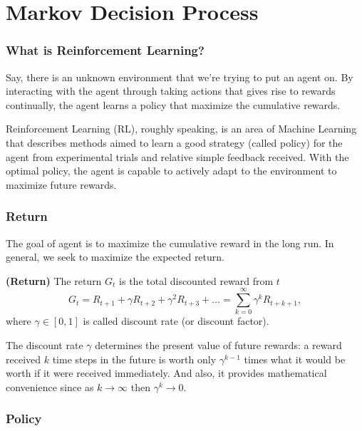 
\chapter{Markov Decision Process}



\subsection{What is Reinforcement Learning?}

Say, there is an unknown environment that we're trying to put an agent on. By 
interacting with the agent through taking actions that gives rise to rewards 
continually, the agent learns a policy that maximize the cumulative rewards.

Reinforcement Learning (RL), roughly speaking, is an area of Machine Learning 
that describes methods aimed to learn a good strategy (called policy) for the 
agent from experimental trials and relative simple feedback received. With the 
optimal policy, the agent is capable to actively adapt to the environment to
maximize future rewards.

\subsection{Return}

The goal of agent is to maximize the cumulative reward in the long run. In 
general, we seek to maximize the expected return.

\begin{definition} {\rm\bf (Return)}
The return $G_t$ is the total discounted reward from $t$
\begin{equation}
G_t=R_{t+1}+\gamma R_{t+2}+\gamma^2 R_{t+3}+\dots=\sum_{k=0}^{\infty}\gamma^k R_{t+k+1},
\end{equation}
where $\gamma\in[0,1]$ is called discount rate (or discount factor).
\end{definition}

The discount rate $\gamma$ determines the present value of future rewards: a 
reward received $k$ time steps in the future is worth only $\gamma^{k-1}$ times 
what it would be worth if it were received immediately. And also, it provides 
mathematical convenience since as $k\rightarrow\infty$ then $\gamma^k\rightarrow 0$.


\subsection{Policy}

